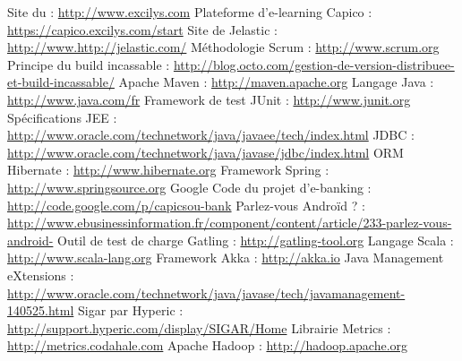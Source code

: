 \begin{thebibliography}{2}
	
	 Site du \excilysGroup{} : \url{http://www.excilys.com}
	 Plateforme d'e-learning Capico : \url{https://capico.excilys.com/start}
	 Site de Jelastic : \url{http://www.http://jelastic.com/}
	 Méthodologie Scrum : \url{http://www.scrum.org}
	 Principe du build incassable : \url{http://blog.octo.com/gestion-de-version-distribuee-et-build-incassable/}
	 Apache Maven : \url{http://maven.apache.org}
	 Langage Java : \url{http://www.java.com/fr}
	 Framework de test JUnit : \url{http://www.junit.org}
	 Spécifications JEE : \url{http://www.oracle.com/technetwork/java/javaee/tech/index.html}
	 JDBC : \url{http://www.oracle.com/technetwork/java/javase/jdbc/index.html}
	 ORM Hibernate : \url{http://www.hibernate.org}
	 Framework Spring : \url{http://www.springsource.org}
	 Google Code du projet d'e-banking : \url{http://code.google.com/p/capicsou-bank}
	 Parlez-vous Androïd ? : \url{http://www.ebusinessinformation.fr/component/content/article/233-parlez-vous-android-}
	 Outil de test de charge Gatling : \url{http://gatling-tool.org}
	 Langage Scala : \url{http://www.scala-lang.org}
	 Framework Akka : \url{http://akka.io}
	 Java Management eXtensions : \url{http://www.oracle.com/technetwork/java/javase/tech/javamanagement-140525.html}
	 Sigar par Hyperic : \url{http://support.hyperic.com/display/SIGAR/Home}
	 Librairie Metrics : \url{http://metrics.codahale.com}
	 Apache Hadoop : \url{http://hadoop.apache.org}
\end{thebibliography}
